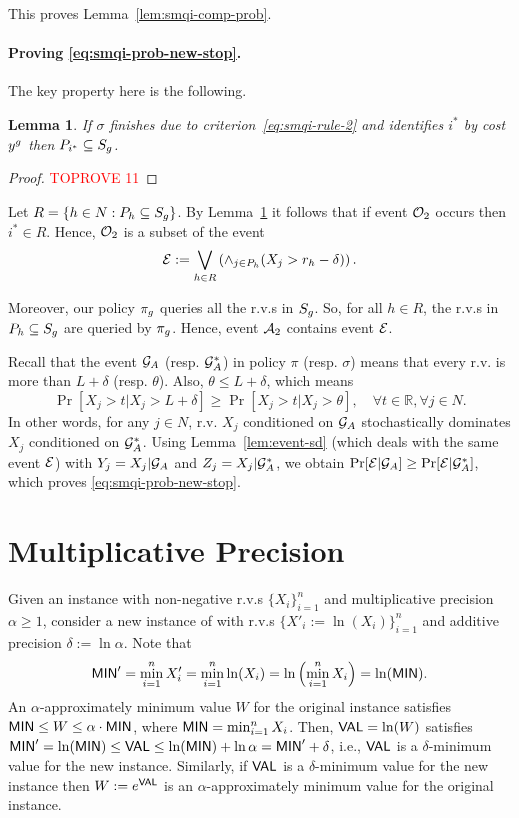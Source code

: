 \documentclass[11pt]{article}
\newtheorem{lem}[thm]{Lemma}
\theoremstyle{remark}
\theoremstyle{plain}
\theoremstyle{remark}
\begin{document}
This proves Lemma~\ref{lem:smqi-comp-prob}. 


\paragraph{Proving \eqref{eq:smqi-prob-new-stop}.}  The key property here is the following.
\begin{lem}\label{lem:smqi-stop-S}
    If $\sigma$ finishes due to criterion~\eqref{eq:smqi-rule-2} and identifies $i^*$ by cost  $y^g$  then $P_{i^*}\subseteq S_g$.
\end{lem}
\begin{proof}\textcolor{red}{TOPROVE 11}\end{proof}

Let $R=\{h\in N: P_h \subseteq S_g\}$. By Lemma~\ref{lem:smqi-stop-S} it follows that if event ${\cal O}_2$ occurs then  $i^*\in R$. Hence, ${\cal O}_2$ 
is a subset of the event
$${\cal E} := \bigvee_{h\in R}  \left( \wedge_{j\in P_h} (X_j > r_h-\delta)\right) .$$



Moreover, our  policy $\pi_g$ queries all the r.v.s in $S_g$. So, for all $h\in R$, the r.v.s in $P_h\subseteq S_g$ are queried by $\pi_g$. Hence,  event ${\cal A}_2$  
contains event ${\cal E}$.

Recall that the event ${\cal G}_A$ (resp. ${\cal G}^*_A$) in policy $\pi$ (resp. $\sigma$) means that every  r.v. is more than $L+\delta$ (resp. $\theta$). Also, $\theta \le L+\delta$, which means 
$$\Pr[X_j > t | X_j >L+\delta] \ge \Pr[X_j > t | X_j >\theta], \quad \forall t\in \mathbb{R} , \forall j\in N. $$
In other words, for any $j\in N$, r.v. $X_j$ conditioned on ${\cal G}_A$ stochastically dominates $X_j$ conditioned on ${\cal G}^*_A$.  Using Lemma~\ref{lem:event-sd} (which deals with the same event ${\cal E}$) with $Y_j = X_j | {\cal G}_A$ and $Z_j = X_j | {\cal G}^*_A$, we obtain $\Pr[{\cal E}  | {\cal G}_A] \ge \Pr[{\cal E} | {\cal G}^*_A]$, which proves \eqref{eq:smqi-prob-new-stop}.




 






\appendix
\section{Multiplicative Precision}\label{app:multiplicative}
Given an instance with non-negative r.v.s $\{X_i\}_{i=1}^n$ and multiplicative precision $\alpha \ge 1$, consider a new instance of \smq with r.v.s $\{X'_i := \ln(X_i)\}_{i=1}^n$ and additive precision $\delta:= \ln \alpha$. Note that 
$${\sf MIN}'=\min_{i=1}^n X'_i=\min_{i=1}^n \ln(X_i) = \ln\left(\min_{i=1}^n X_i\right)=\ln ({\sf MIN}).$$
An  $\alpha$-approximately minimum value $W$ for the original instance satisfies ${\sf MIN}\le W\le \alpha\cdot {\sf MIN}$, where ${\sf MIN}=\min_{i=1}^n X_i$. Then,  ${\sf VAL}=\ln(W)$ satisfies
${\sf MIN}' = \ln ({\sf MIN}) \le {\sf VAL} \le \ln({\sf MIN}) + \ln \alpha = {\sf MIN}'+\delta$, i.e., ${\sf VAL}$ is a $\delta$-minimum value for the new instance. Similarly, if ${\sf VAL}$ is a $\delta$-minimum value for the new instance then $W:=e^{{\sf VAL}}$ is an $\alpha$-approximately minimum value  for the original instance.
\end{document}
